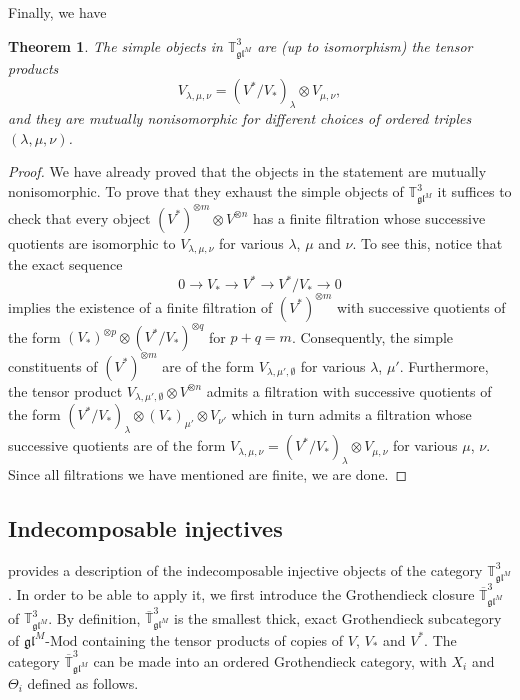 \documentclass[11pt]{article}
\theoremstyle{plain}
\newtheorem{theorem}[lemma]{Theorem}
\theoremstyle{nonumberplain}
\theoremstyle{plain}
\theoremstyle{nonumberplain}
\newtheorem{proof}{Proof}
\newcommand\bT{{\mathbb T}}
\newcommand\fgl{\mathfrak{gl}}
\newcommand\ol{\overline}
\begin{document}
Finally, we have


\begin{theorem}\label{th.3d_simples}
The simple objects in $\bT^3_{\fgl^M}$ are (up to isomorphism) the tensor products
  \begin{equation*}
    V_{\lambda,\mu,\nu}=(V^*/V_*)_\lambda\otimes V_{\mu,\nu},
  \end{equation*}
and they are mutually nonisomorphic for different choices of ordered triples $(\lambda,\mu,\nu)$. 
\end{theorem}
\begin{proof}
  We have already proved that the objects in the statement are mutually nonisomorphic. To prove that they exhaust the simple objects of $\bT^3_{\fgl^M}$ it suffices to check that every object $(V^*)^{\otimes m}\otimes V^{\otimes n}$ has a finite filtration whose successive quotients are isomorphic to $V_{\lambda,\mu,\nu}$ for various $\lambda$, $\mu$ and $\nu$. To see this, notice that the exact sequence
  \begin{equation*}
    0\to V_*\to V^*\to V^*/V_*\to 0
  \end{equation*}
implies the existence of a finite filtration of $(V^*)^{\otimes m}$ with successive quotients of the form $(V_*)^{\otimes p}\otimes (V^*/V_*)^{\otimes q}$ for $p+q=m$. Consequently, the simple constituents of $(V^*)^{\otimes m}$ are of the form $V_{\lambda,\mu',\emptyset}$ for various $\lambda$, $\mu'$. Furthermore, the tensor product $V_{\lambda,\mu',\emptyset}\otimes V^{\otimes n}$ admits a filtration with successive quotients of the form $(V^*/V_*)_{\lambda}\otimes (V_*)_{\mu'}\otimes V_{\nu'}$ which in turn admits a filtration whose successive quotients are of the form $V_{\lambda,\mu,\nu}=(V^*/V_*)_{\lambda}\otimes V_{\mu,\nu}$ for various $\mu$, $\nu$. Since all filtrations we have mentioned are finite, we are done. 
\end{proof}




\subsection{Indecomposable injectives}\label{subse.inj_soc}



 provides a description of the indecomposable injective objects of the category $\bT^3_{\fgl^M}$.   In order to be able to apply it, we first introduce the Grothendieck closure $\overline{\bT}^3_{\fgl^M}$ of $\bT^3_{\fgl^M}$.  By definition, $\overline{\bT}^3_{\fgl^M}$ is the smallest thick, exact Grothendieck subcategory of $\fgl^M\text{-}\mathrm{Mod}$ containing the tensor products of copies of $V$, $V_*$ and $V^*$.  The category $\ol{\bT}^3_{\fgl^M}$ can be made into an ordered Grothendieck category, with $X_i$ and $\Theta_i$ defined as follows.  
\end{document}
